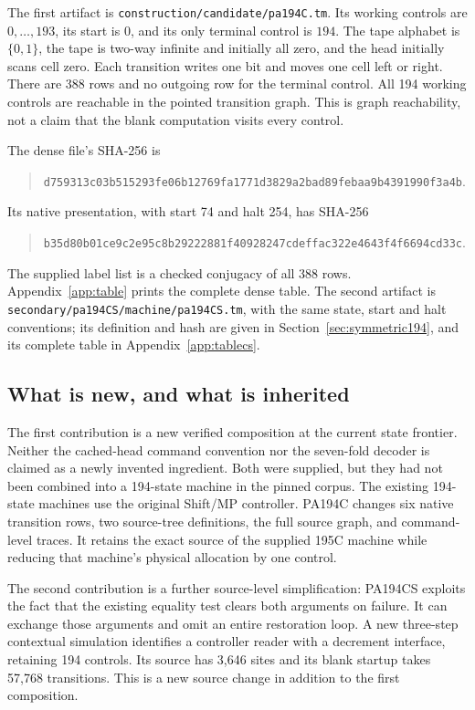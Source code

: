 \documentclass[11pt,letterpaper]{article}
\newcommand{\file}[1]{\texttt{\nolinkurl{#1}}}
\begin{document}
The first artifact is \file{construction/candidate/pa194C.tm}.
Its working controls are $0,\ldots,193$, its start is $0$, and its only
terminal control is $194$. The tape alphabet is $\{0,1\}$, the tape is
two-way infinite and initially all zero, and the head initially scans
cell zero. Each transition writes one bit and moves one cell left or
right. There are 388 rows and no outgoing row for the terminal control.
All 194 working controls are reachable in the pointed transition graph.
This is graph reachability, not a claim that the blank computation visits
every control.

The dense file's SHA-256 is
\begin{quote}\small
\nolinkurl{d759313c03b515293fe06b12769fa1771d3829a2bad89febaa9b4391990f3a4b}.
\end{quote}
Its native presentation, with start 74 and halt 254, has SHA-256
\begin{quote}\small
\nolinkurl{b35d80b01ce9c2e95c8b29222881f40928247cdeffac322e4643f4f6694cd33c}.
\end{quote}
The supplied label list is a checked conjugacy of all 388 rows.
Appendix~\ref{app:table} prints the complete dense table.
The second artifact is \file{secondary/pa194CS/machine/pa194CS.tm},
with the same state, start and halt conventions; its definition and hash
are given in Section~\ref{sec:symmetric194}, and its complete table in
Appendix~\ref{app:tablecs}.

\subsection{What is new, and what is inherited}

The first contribution is a new verified composition at the current state
frontier. Neither the cached-head command convention nor the seven-fold
decoder is claimed as a newly invented ingredient. Both were supplied,
but they had not been combined into a 194-state machine in the pinned
corpus. The existing 194-state machines use the original Shift/MP
controller. PA194C changes six native transition rows, two source-tree
definitions, the full source graph, and command-level traces. It retains
the exact source of the supplied 195C machine while reducing that
machine's physical allocation by one control.

The second contribution is a further source-level simplification:
PA194CS exploits the fact that the existing equality test clears both
arguments on failure. It can exchange those arguments and omit an entire
restoration loop. A new three-step contextual simulation identifies a
controller reader with a decrement interface, retaining 194 controls.
Its source has 3,646 sites and its blank startup takes 57,768 transitions.
This is a new source change in addition to the first composition.
\end{document}
